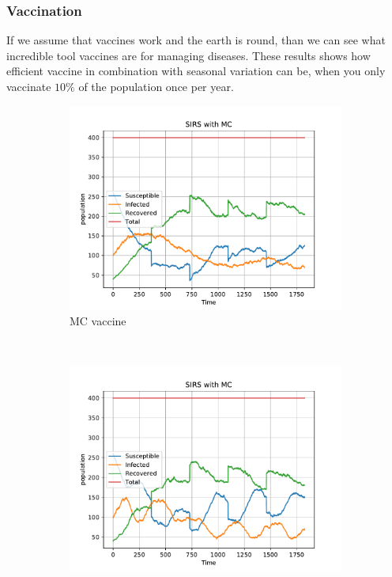 \pagebreak
\subsubsection{Vaccination}
	If we assume that vaccines work and the earth is round, than we can see what incredible tool vaccines are for managing diseases. These results shows how efficient vaccine in combination with seasonal variation can be, when you only vaccinate $10\%$ of the population once per year.
\begin{figure}[H]
    \centering
    \begin{subfigure}{0.30\textwidth}
        \centering
        \includegraphics[width=\linewidth]{../fig/newfig/MC_onlyvaccineT=5f=40.pdf}
        \caption{MC vaccine}
    \end{subfigure}
     ~ 
    \begin{subfigure}{0.30\textwidth}
         \centering
         \includegraphics[width=\linewidth]{../fig/newfig/MC_vaccine_SVA=4_T=5f=40_notiming.pdf}

\end{subfigure}
\end{figure}
